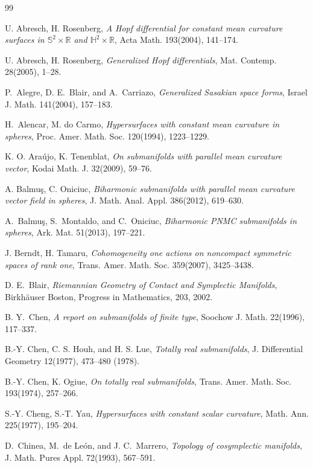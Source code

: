 \documentclass[11pt]{amsart}
\theoremstyle{plain}
\theoremstyle{definition}
\numberwithin{equation}{section}
\begin{document}
\begin{thebibliography}{99}

 U. Abresch, H. Rosenberg, \textit{A Hopf differential for constant mean curvature
surfaces in $\mathbb{S}^2\times\mathbb{R}$ and
$\mathbb{H}^2\times\mathbb{R}$}, Acta Math. 193(2004), 141--174.

 U. Abresch, H. Rosenberg, \textit{Generalized Hopf
differentials}, Mat. Contemp. 28(2005), 1--28.

 P.~Alegre, D. E.~Blair, and A.~Carriazo, \textit{Generalized Sasakian space forms}, Israel J. Math. 141(2004), 157--183.

 H.~Alencar, M. do Carmo, {\it Hypersurfaces with constant mean curvature in spheres},  Proc. Amer. Math. Soc.  120(1994), 1223--1229.

 K. O. Ara\'ujo, K. Tenenblat, {\it On submanifolds with parallel mean curvature vector}, Kodai Math. J. 32(2009), 59--76.

 A. Balmuş, C. Oniciuc, {\it Biharmonic submanifolds with parallel mean curvature vector field in spheres}, J. Math. Anal. Appl. 386(2012), 619--630. 

 A.~Balmu\c s, S.~Montaldo, and C.~Oniciuc, \textit{Biharmonic PNMC submanifolds in spheres}, Ark. Mat. 51(2013), 197--221.

 J. Berndt, H. Tamaru, \textit{Cohomogeneity one actions on noncompact symmetric spaces of rank one}, Trans. Amer. Math. Soc. 359(2007), 3425--3438. 

  D. E.~Blair, \textit{Riemannian Geometry of Contact and Symplectic Manifolds}, Birkh\"{a}user Boston, Progress in Mathematics, 203, 2002.

 B. Y.~Chen, \textit{A report on submanifolds of finite type}, Soochow J. Math. 22(1996), 117--337.

 B.-Y. Chen, C. S. Houh, and H. S. Lue, {\it Totally real submanifolds}, J. Differential Geometry 12(1977), 473--480 (1978).

 B.-Y. Chen, K. Ogiue, {\it On totally real submanifolds}, Trans. Amer. Math. Soc. 193(1974), 257--266.


 S.-Y. Cheng, S.-T. Yau, \textit{Hypersurfaces with constant scalar curvature}, Math. Ann. 225(1977), 195--204.


 D.~Chinea, M.~de Le\'on, and J. C.~Marrero, \textit{Topology of cosymplectic manifolds},  J. Math. Pures Appl. 72(1993), 567--591.


\end{thebibliography}
\end{document}
